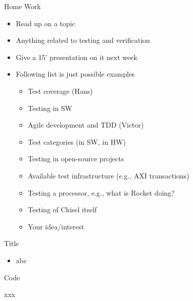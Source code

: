 \begin{frame}[fragile]{Home Work}
\begin{itemize}
\item Read up on a topic
\item Anything related to testing and verification
\item Give a 15' presentation on it next week
\item Following list is just possible examples
\begin{itemize}
\item Test coverage (Hans)
\item Testing in SW
\item Agile development and TDD (Victor)
\item Test categories (in SW, in HW)
\item Testing in open-source projects
\item Available test infrastructure (e.g., AXI transactions)
\item Testing a processor, e.g., what is Rocket doing?
\item Testing of Chisel itself
\item Your idea/interest
\end{itemize}
\end{itemize}
\end{frame}





\begin{frame}[fragile]{Title}
\begin{itemize}
\item abc
\end{itemize}
\end{frame}

\begin{frame}[fragile]{Code}
\begin{chisel}
xxx
\end{chisel}
\end{frame}
